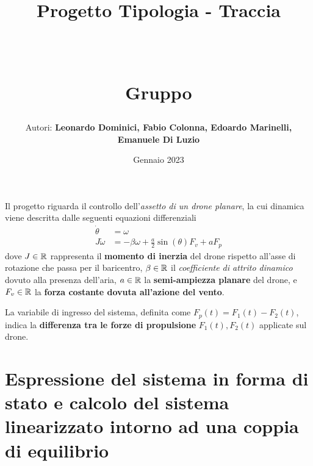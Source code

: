 \documentclass[a4paper, 11pt]{article}
\title{ \vspace{-1in}
		\huge \strut \coursename \strut \\
		\Large  \strut Progetto Tipologia \tipology - Traccia \trace \\
		\Large  \strut \projectname\strut \\
		\Large  \strut Gruppo \group\strut
		\vspace{-0.4cm}
}
\author{Autori: \textbf{Leonardo Dominici, Fabio Colonna, Edoardo Marinelli, Emanuele Di Luzio}}
\date{Gennaio 2023}
\begin{document}
\maketitle

Il progetto riguarda il controllo dell'\textit{assetto di un drone planare}, la cui dinamica viene descritta dalle seguenti equazioni differenziali 
%
\begin{subequations}\label{eq:system}
\begin{align}
	\dot \theta & = \omega 
	\\
	J \dot \omega & = -\beta \omega + \frac{a}{2} \sin(\theta) F_v + a F_p
\end{align}
\end{subequations}
%
dove $J \in \mathbb{R}$ rappresenta il \textbf{momento di inerzia} del drone rispetto all'asse di rotazione che passa per il baricentro, $\beta \in \mathbb{R}$ il \textit{coefficiente di attrito dinamico} dovuto alla presenza dell'aria, $a \in \mathbb{R}$ la \textbf{semi-ampiezza planare} del drone, e $F_v \in \mathbb{R}$ la \textbf{forza costante dovuta all'azione del vento}.

\bb

La variabile di ingresso del sistema, definita come $F_p(t) = F_1(t) - F_2(t)$, indica la \textbf{differenza tra le forze di propulsione} $F_1(t), F_2(t)$ applicate sul drone.


\section{Espressione del sistema in forma di stato e calcolo del sistema linearizzato intorno ad una coppia di equilibrio}
\end{document}
